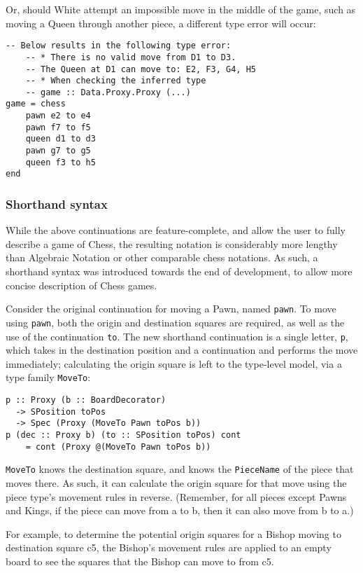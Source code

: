 \documentclass[12pt, a4paper, bibliography=totocnumbered]{scrreprt}
\newcommand{\inline}[1]{\lstinline[basicstyle=\ttfamily\footnotesize]{#1}}
\begin{document}
Or, should White attempt an impossible move in the middle of the game, such as moving a Queen through another piece, a different type error will occur:

\begin{lstlisting}
-- Below results in the following type error:
    -- * There is no valid move from D1 to D3.
    -- The Queen at D1 can move to: E2, F3, G4, H5
    -- * When checking the inferred type
    -- game :: Data.Proxy.Proxy (...)
game = chess
    pawn e2 to e4
    pawn f7 to f5
    queen d1 to d3
    pawn g7 to g5
    queen f3 to h5
end
\end{lstlisting}

\subsubsection{Shorthand syntax} \label{shorthandexplanation}

While the above continuations are feature-complete, and allow the user to fully describe a game of Chess, the resulting notation is considerably more lengthy than Algebraic Notation or other comparable chess notations. As such, a shorthand syntax was introduced towards the end of development, to allow more concise description of Chess games.

Consider the original continuation for moving a Pawn, named \inline{pawn}. To move using \inline{pawn}, both the origin and destination squares are required, as well as the use of the continuation \inline{to}. The new shorthand continuation is a single letter, \inline{p}, which takes in the destination position and a continuation and performs the move immediately; calculating the origin square is left to the type-level model, via a type family \inline{MoveTo}:

\begin{lstlisting}
p :: Proxy (b :: BoardDecorator)
  -> SPosition toPos
  -> Spec (Proxy (MoveTo Pawn toPos b))
p (dec :: Proxy b) (to :: SPosition toPos) cont
    = cont (Proxy @(MoveTo Pawn toPos b))
\end{lstlisting}

\inline{MoveTo} knows the destination square, and knows the \inline{PieceName} of the piece that moves there. As such, it can calculate the origin square for that move using the piece type's movement rules in reverse. (Remember, for all pieces except Pawns and Kings, if the piece can move from a to b, then it can also move from b to a.)

For example, to determine the potential origin squares for a Bishop moving to destination square c5, the Bishop's movement rules are applied to an empty board to see the squares that the Bishop can move to from c5.
\end{document}
